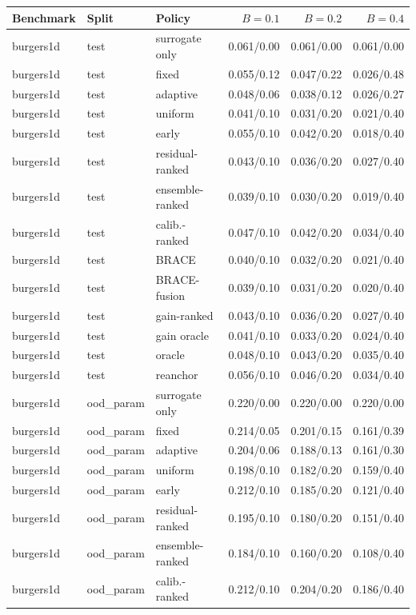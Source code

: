 \begin{tabular}{lllrrr}
\toprule
Benchmark & Split & Policy & $B=0.1$ & $B=0.2$ & $B=0.4$ \\
\midrule
burgers1d & test & surrogate only & 0.061/0.00 & 0.061/0.00 & 0.061/0.00 \\
burgers1d & test & fixed & 0.055/0.12 & 0.047/0.22 & 0.026/0.48 \\
burgers1d & test & adaptive & 0.048/0.06 & 0.038/0.12 & 0.026/0.27 \\
burgers1d & test & uniform & 0.041/0.10 & 0.031/0.20 & 0.021/0.40 \\
burgers1d & test & early & 0.055/0.10 & 0.042/0.20 & 0.018/0.40 \\
burgers1d & test & residual-ranked & 0.043/0.10 & 0.036/0.20 & 0.027/0.40 \\
burgers1d & test & ensemble-ranked & 0.039/0.10 & 0.030/0.20 & 0.019/0.40 \\
burgers1d & test & calib.-ranked & 0.047/0.10 & 0.042/0.20 & 0.034/0.40 \\
burgers1d & test & BRACE & 0.040/0.10 & 0.032/0.20 & 0.021/0.40 \\
burgers1d & test & BRACE-fusion & 0.039/0.10 & 0.031/0.20 & 0.020/0.40 \\
burgers1d & test & gain-ranked & 0.043/0.10 & 0.036/0.20 & 0.027/0.40 \\
burgers1d & test & gain oracle & 0.041/0.10 & 0.033/0.20 & 0.024/0.40 \\
burgers1d & test & oracle & 0.048/0.10 & 0.043/0.20 & 0.035/0.40 \\
burgers1d & test & reanchor & 0.056/0.10 & 0.046/0.20 & 0.034/0.40 \\
\midrule
burgers1d & ood\_param & surrogate only & 0.220/0.00 & 0.220/0.00 & 0.220/0.00 \\
burgers1d & ood\_param & fixed & 0.214/0.05 & 0.201/0.15 & 0.161/0.39 \\
burgers1d & ood\_param & adaptive & 0.204/0.06 & 0.188/0.13 & 0.161/0.30 \\
burgers1d & ood\_param & uniform & 0.198/0.10 & 0.182/0.20 & 0.159/0.40 \\
burgers1d & ood\_param & early & 0.212/0.10 & 0.185/0.20 & 0.121/0.40 \\
burgers1d & ood\_param & residual-ranked & 0.195/0.10 & 0.180/0.20 & 0.151/0.40 \\
burgers1d & ood\_param & ensemble-ranked & 0.184/0.10 & 0.160/0.20 & 0.108/0.40 \\
burgers1d & ood\_param & calib.-ranked & 0.212/0.10 & 0.204/0.20 & 0.186/0.40 \\

\end{tabular}
